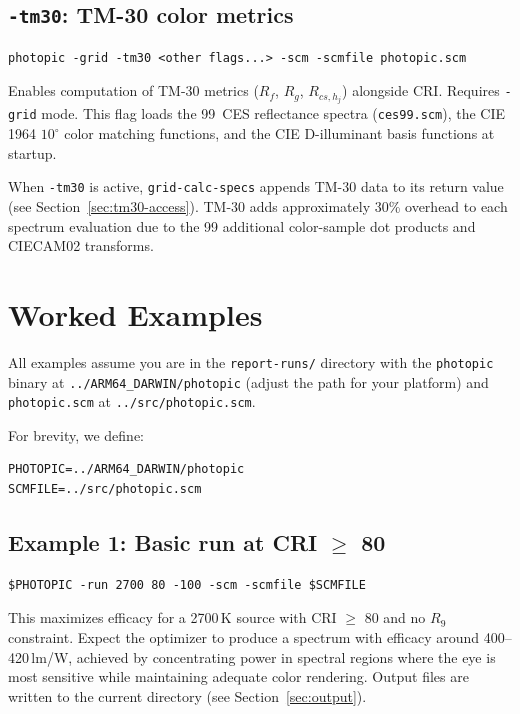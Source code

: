 \documentclass[11pt]{article}
\newcommand{\photopic}{\texttt{photopic}}
\newcommand{\cmd}[1]{\texttt{#1}}
\newcommand{\file}[1]{\texttt{#1}}
\begin{document}
\subsection{\texttt{-tm30}: TM-30 color metrics}
\label{sec:tm30-cli}

\begin{lstlisting}[style=shell]
photopic -grid -tm30 <other flags...> -scm -scmfile photopic.scm
\end{lstlisting}

Enables computation of TM-30 metrics ($R_f$, $R_g$, $R_{cs,h_j}$)
alongside CRI.  Requires \cmd{-grid} mode.  This flag loads the 99~CES
reflectance spectra (\file{ces99.scm}), the CIE 1964 $10^\circ$ color
matching functions, and the CIE D-illuminant basis functions at startup.

When \cmd{-tm30} is active, \cmd{grid-calc-specs} appends TM-30 data to
its return value (see Section~\ref{sec:tm30-access}).  TM-30 adds
approximately 30\% overhead to each spectrum evaluation due to the 99
additional color-sample dot products and CIECAM02 transforms.

\section{Worked Examples}
\label{sec:examples}

All examples assume you are in the \file{report-runs/} directory with
the \photopic{} binary at \file{../ARM64\_DARWIN/\allowbreak{}photopic}
(adjust the path for your platform) and \file{photopic.scm} at
\file{../src/\allowbreak{}photopic.scm}.

For brevity, we define:
\begin{lstlisting}[style=shell]
PHOTOPIC=../ARM64_DARWIN/photopic
SCMFILE=../src/photopic.scm
\end{lstlisting}

\subsection{Example 1: Basic run at CRI $\geq$ 80}

\begin{lstlisting}[style=shell]
$PHOTOPIC -run 2700 80 -100 -scm -scmfile $SCMFILE
\end{lstlisting}

This maximizes efficacy for a 2700\,K source with CRI $\geq$ 80 and no
$R_9$ constraint.  Expect the optimizer to produce a spectrum with
efficacy around 400--420\,lm/W, achieved by concentrating power in
spectral regions where the eye is most sensitive while maintaining
adequate color rendering.  Output files are written to the current
directory (see Section~\ref{sec:output}).
\end{document}

